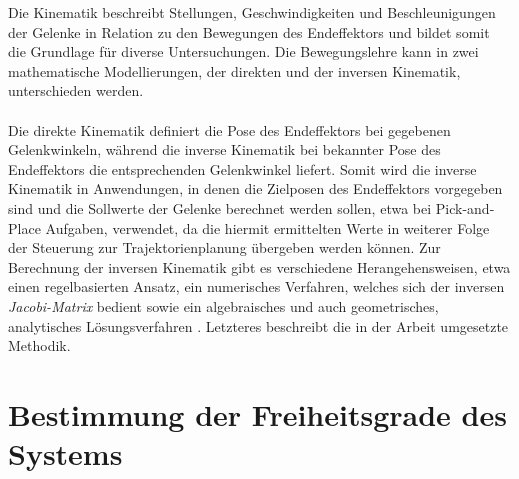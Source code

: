 \documentclass[Bachelor, BMR, ngerman]{twbook}
\begin{document}
    Die Kinematik beschreibt Stellungen, Geschwindigkeiten und Beschleunigungen der Gelenke in Relation zu den Bewegungen des Endeffektors und bildet somit die Grundlage für diverse Untersuchungen. Die Bewegungslehre kann in zwei mathematische Modellierungen, der direkten und der inversen Kinematik, unterschieden werden.\\
    \\
    Die direkte Kinematik definiert die Pose des Endeffektors bei gegebenen Gelenkwinkeln, während die inverse Kinematik bei bekannter Pose des Endeffektors die entsprechenden Gelenkwinkel liefert. Somit wird die inverse Kinematik in Anwendungen, in denen die Zielposen des Endeffektors vorgegeben sind und die Sollwerte der Gelenke berechnet werden sollen, etwa bei Pick-and-Place Aufgaben, verwendet, da die hiermit ermittelten Werte in weiterer Folge der Steuerung zur Trajektorienplanung übergeben werden können. Zur Berechnung der inversen Kinematik gibt es verschiedene Herangehensweisen, etwa einen regelbasierten Ansatz, ein numerisches Verfahren, welches sich der inversen \textit{Jacobi-Matrix} bedient sowie ein algebraisches und auch geometrisches, analytisches Lösungsverfahren \cite{We08}. Letzteres beschreibt die in der Arbeit umgesetzte Methodik. 

    \section{Bestimmung der Freiheitsgrade des Systems}
    \label{sec:DoF}
\end{document}

